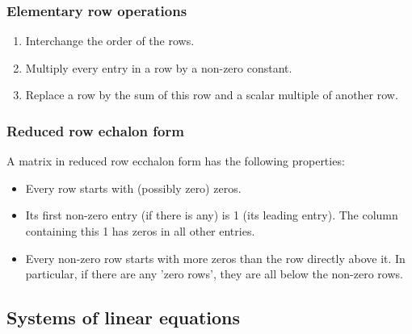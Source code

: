 \subsubsection{Elementary row operations}
\begin{enumerate}
    \item Interchange the order of the rows.
    \item Multiply every entry in a row by a non-zero constant.
    \item Replace a row by the sum of this row and a scalar multiple of another row.
\end{enumerate}

\subsubsection{Reduced row echalon form}
A matrix in reduced row ecchalon form has the following properties:
\begin{itemize}
    \item Every row starts with (possibly zero) zeros.
    \item Its first non-zero entry (if there is any) is 1 (its leading entry). The column containing this 1 has zeros in all other entries.
    \item Every non-zero row starts with more zeros than the row directly above it. In particular, if there are any 'zero rows', they are all below the non-zero rows.
\end{itemize}

\subsection{Systems of linear equations}

